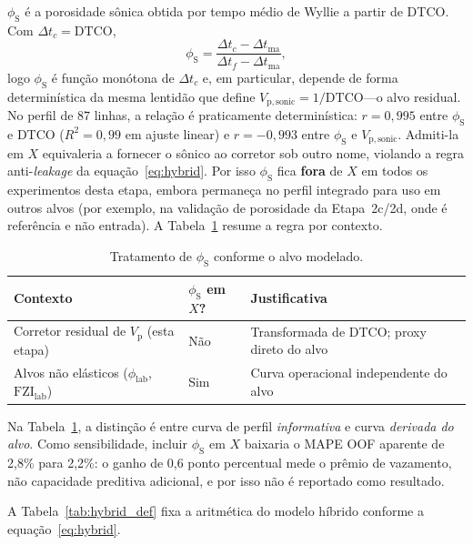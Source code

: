\documentclass[11pt,a4paper]{article}
\numberwithin{equation}{section}
\newcommand{\Vp}{\ensuremath{V_{\mathrm{p}}}}
\newcommand{\philab}{\ensuremath{\phi_{\mathrm{lab}}}}
\newcommand{\fzilab}{\ensuremath{\mathrm{FZI}_{\mathrm{lab}}}}
\newcommand{\phiS}{\ensuremath{\phi_{\mathrm{S}}}}
\begin{document}
\phiS{} é a porosidade sônica obtida por tempo médio de Wyllie a partir de
DTCO. Com $\Delta t_c=\mathrm{DTCO}$,
\begin{equation}
  \phiS{}
  =
  \frac{\Delta t_c-\Delta t_{\mathrm{ma}}}
       {\Delta t_f-\Delta t_{\mathrm{ma}}},
\end{equation}
logo $\phiS{}$ é função monótona de $\Delta t_c$ e, em particular,
depende de forma determinística da mesma lentidão que define
$V_{\mathrm{p,sonic}}=1/\mathrm{DTCO}$---o alvo residual.
No perfil de 87 linhas, a relação é praticamente determinística:
$r = 0{,}995$ entre \phiS{} e DTCO ($R^2 = 0{,}99$ em ajuste linear) e
$r = -0{,}993$ entre \phiS{} e $V_{\mathrm{p,sonic}}$.
Admiti-la em $X$ equivaleria a fornecer o sônico ao corretor sob outro nome,
violando a regra anti-\emph{leakage} da equação~\eqref{eq:hybrid}.
Por isso \phiS{} fica \textbf{fora} de $X$ em todos os experimentos desta
etapa, embora permaneça no perfil integrado para uso em outros alvos
(por exemplo, na validação de porosidade da Etapa~2c/2d, onde é referência
e não entrada).
A Tabela~\ref{tab:phi_sonic_scenarios} resume a regra por contexto.

\begin{table}[H]
  \centering
  \caption{Tratamento de \phiS{} conforme o alvo modelado.}
  \label{tab:phi_sonic_scenarios}
  \begin{tabular}{p{3.2cm}p{4.5cm}p{5.5cm}}
    \toprule
    Contexto & \phiS{} em $X$? & Justificativa \\
    \midrule
    Corretor residual de \Vp{} (esta etapa) & Não & Transformada de DTCO; proxy direto do alvo \\
    Alvos não elásticos (\philab{}, \fzilab{}) & Sim & Curva operacional independente do alvo \\
    \bottomrule
  \end{tabular}
\end{table}

Na Tabela~\ref{tab:phi_sonic_scenarios}, a distinção é entre curva de perfil
\emph{informativa} e curva \emph{derivada do alvo}.
Como sensibilidade, incluir \phiS{} em $X$ baixaria o MAPE OOF aparente de
2,8\% para 2,2\%: o ganho de 0,6 ponto percentual mede o prêmio de vazamento,
não capacidade preditiva adicional, e por isso não é reportado como resultado.

A Tabela~\ref{tab:hybrid_def} fixa a aritmética do modelo híbrido conforme
a equação~\eqref{eq:hybrid}.
\end{document}
